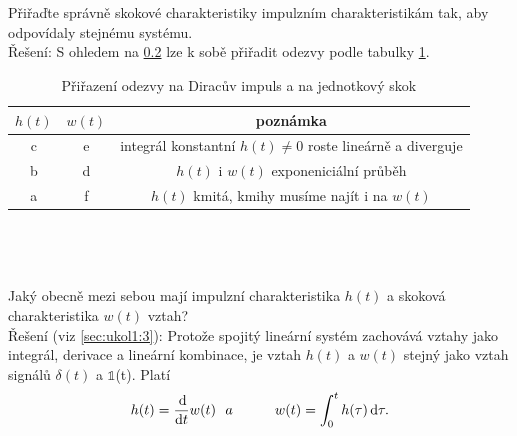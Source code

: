 \documentclass[twoside]{article}
\begin{document}
\subsection{~}
Přiřaďte správně skokové charakteristiky impulzním charakteristikám tak, aby odpovídaly stejnému systému. \\
Řešení: S ohledem na \ref{sec:ukol11:2} lze k sobě přiřadit odezvy podle tabulky \ref{tab:odezvy}.
\begin{table}[htbp]
	\label{tab:odezvy}
	\centering
	\begin{tabular}{c|c|c}
		$h(t)$ & $w(t)$ & poznámka \\
		\hline
		c & e & integrál konstantní $h(t) \neq 0 $ roste lineárně a diverguje \\
		b & d & $h(t)$ i $w(t)$ exponeniciální průběh \\
		a & f & $h(t)$ kmitá, kmihy musíme najít i na $w(t)$
	\end{tabular}
	\caption{Přiřazení odezvy na Diracův impuls a na jednotkový skok}
\end{table} 

\subsection{~}
\label{sec:ukol11:2}
Jaký obecně mezi sebou mají impulzní charakteristika $h(t)$ a skoková charakteristika $w(t)$ vztah? \\
Řešení (viz \ref{sec:ukol1:3}): Protože spojitý lineární systém zachovává vztahy jako integrál, derivace a lineární kombinace,
je vztah $h(t)$ a $w(t)$ stejný jako vztah signálů $\delta(t)$ a $\mathbb{1}$(t). Platí
\begin{equation*}
	h(t) = \frac{\dif}{\dif t} w(t) ~~ a ~~~~~~~~~ w(t) = \int_0^{t} h(\tau) \dif \tau.
\end{equation*}
\end{document}
